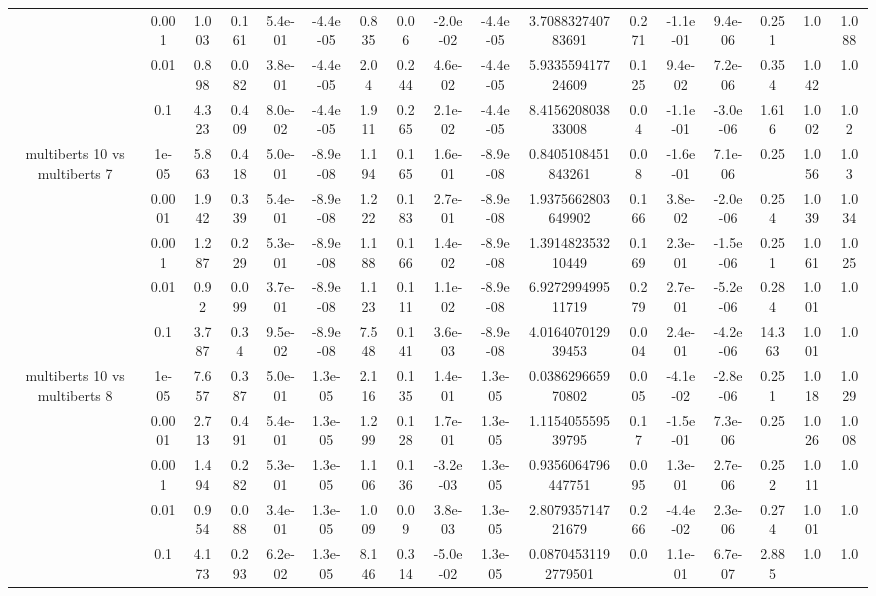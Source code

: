 \begin{tabular}{|c|c|c|c|c|c|c|c|c|c|c|c|c|c|c|c|c|}
 & 0.001 & 1.003 & 0.161 & 5.4e-01 & -4.4e-05 & 0.835 & 0.06 & -2.0e-02 & -4.4e-05 & 3.708832740783691 & 0.271 & -1.1e-01 & 9.4e-06 & 0.251 & 1.0 & 1.088 \\
 & 0.01 & 0.898 & 0.082 & 3.8e-01 & -4.4e-05 & 2.04 & 0.244 & 4.6e-02 & -4.4e-05 & 5.933559417724609 & 0.125 & 9.4e-02 & 7.2e-06 & 0.354 & 1.042 & 1.0 \\
 & 0.1 & 4.323 & 0.409 & 8.0e-02 & -4.4e-05 & 1.911 & 0.265 & 2.1e-02 & -4.4e-05 & 8.415620803833008 & 0.04 & -1.1e-01 & -3.0e-06 & 1.616 & 1.002 & 1.02 \\
\hline
\multirow{5}{*}{multiberts 10 vs multiberts 7} & 1e-05 & 5.863 & 0.418 & 5.0e-01 & -8.9e-08 & 1.194 & 0.165 & 1.6e-01 & -8.9e-08 & 0.8405108451843261 & 0.08 & -1.6e-01 & 7.1e-06 & 0.25 & 1.056 & 1.03 \\
 & 0.0001 & 1.942 & 0.339 & 5.4e-01 & -8.9e-08 & 1.222 & 0.183 & 2.7e-01 & -8.9e-08 & 1.9375662803649902 & 0.166 & 3.8e-02 & -2.0e-06 & 0.254 & 1.039 & 1.034 \\
 & 0.001 & 1.287 & 0.229 & 5.3e-01 & -8.9e-08 & 1.188 & 0.166 & 1.4e-02 & -8.9e-08 & 1.391482353210449 & 0.169 & 2.3e-01 & -1.5e-06 & 0.251 & 1.061 & 1.025 \\
 & 0.01 & 0.92 & 0.099 & 3.7e-01 & -8.9e-08 & 1.123 & 0.111 & 1.1e-02 & -8.9e-08 & 6.927299499511719 & 0.279 & 2.7e-01 & -5.2e-06 & 0.284 & 1.001 & 1.0 \\
 & 0.1 & 3.787 & 0.34 & 9.5e-02 & -8.9e-08 & 7.548 & 0.141 & 3.6e-03 & -8.9e-08 & 4.016407012939453 & 0.004 & 2.4e-01 & -4.2e-06 & 14.363 & 1.001 & 1.0 \\
\hline
\multirow{5}{*}{multiberts 10 vs multiberts 8} & 1e-05 & 7.657 & 0.387 & 5.0e-01 & 1.3e-05 & 2.116 & 0.135 & 1.4e-01 & 1.3e-05 & 0.038629665970802 & 0.005 & -4.1e-02 & -2.8e-06 & 0.251 & 1.018 & 1.029 \\
 & 0.0001 & 2.713 & 0.491 & 5.4e-01 & 1.3e-05 & 1.299 & 0.128 & 1.7e-01 & 1.3e-05 & 1.115405559539795 & 0.17 & -1.5e-01 & 7.3e-06 & 0.25 & 1.026 & 1.008 \\
 & 0.001 & 1.494 & 0.282 & 5.3e-01 & 1.3e-05 & 1.106 & 0.136 & -3.2e-03 & 1.3e-05 & 0.9356064796447751 & 0.095 & 1.3e-01 & 2.7e-06 & 0.252 & 1.011 & 1.0 \\
 & 0.01 & 0.954 & 0.088 & 3.4e-01 & 1.3e-05 & 1.009 & 0.09 & 3.8e-03 & 1.3e-05 & 2.807935714721679 & 0.266 & -4.4e-02 & 2.3e-06 & 0.274 & 1.001 & 1.0 \\
 & 0.1 & 4.173 & 0.293 & 6.2e-02 & 1.3e-05 & 8.146 & 0.314 & -5.0e-02 & 1.3e-05 & 0.08704531192779501 & 0.0 & 1.1e-01 & 6.7e-07 & 2.885 & 1.0 & 1.0 \\

\end{tabular}
